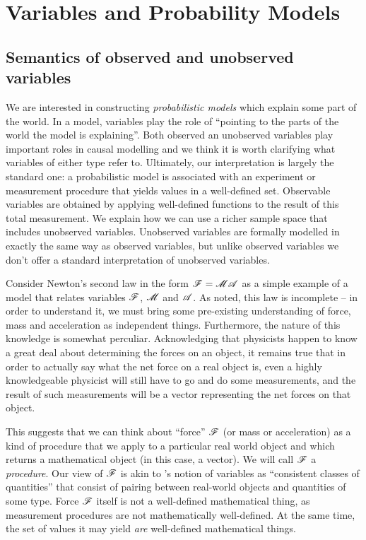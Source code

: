 

\section{Variables and Probability Models}\label{sec:vague_variables}

\subsection{Semantics of observed and unobserved variables}\label{sec:variables}

We are interested in constructing \emph{probabilistic models} which explain some part of the world. In a model, variables play the role of ``pointing to the parts of the world the model is explaining''. Both observed an unobserved variables play important roles in causal modelling and we think it is worth clarifying what variables of either type refer to. Ultimately, our interpretation is largely the standard one: a probabilistic model is associated with an experiment or measurement procedure that yields values in a well-defined set. Observable variables are obtained by applying well-defined functions to the result of this total measurement. We explain how we can use a richer sample space that includes unobserved variables. Unobserved variables are formally modelled in exactly the same way as observed variables, but unlike observed variables we don't offer a standard interpretation of unobserved variables. 

Consider Newton's second law in the form $\mathscr{F}=\mathscr{MA}$ as a simple example of a model that relates variables $\mathscr{F}$, $\mathscr{M}$ and $\mathscr{A}$. As \citet{feynman_feynman_1979} noted, this law is incomplete -- in order to understand it, we must bring some pre-existing understanding of force, mass and acceleration as independent things. Furthermore, the nature of this knowledge is somewhat perculiar. Acknowledging that physicists happen to know a great deal about determining the forces on an object, it remains true that in order to actually say what the net force on a real object is, even a highly knowledgeable physicist will still have to go and do some measurements, and the result of such measurements will be a vector representing the net forces on that object.

This suggests that we can think about ``force'' $\mathscr{F}$ (or mass or acceleration) as a kind of procedure that we apply to a particular real world object and which returns a mathematical object (in this case, a vector). We will call $\mathscr{F}$ a \emph{procedure}. Our view of $\mathscr{F}$ is akin to \citet{menger_random_2003}'s notion of variables as ``consistent classes of quantities'' that consist of pairing between real-world objects and quantities of some type. Force $\mathscr{F}$ itself is not a well-defined mathematical thing, as measurement procedures are not mathematically well-defined. At the same time, the set of values it may yield \emph{are} well-defined mathematical things.

